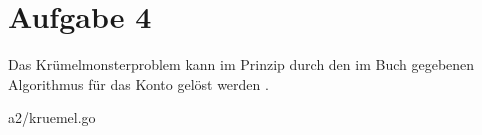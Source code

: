 \documentclass[11pt,a4paper,DIV=10,]{scrartcl}
\begin{document}
\section*{Aufgabe 4}
Das Krümelmonsterproblem kann im Prinzip durch den im Buch gegebenen Algorithmus für das Konto  gelöst werden \citep[vgl.][S. 135]{Maurer.2012}.
\begin{multicols}{2}[]

{a2/kruemel.go}
\end{multicols}


\end{document}
